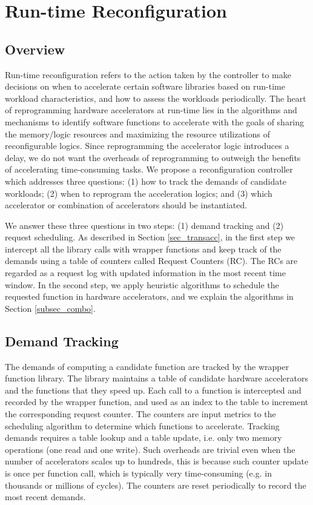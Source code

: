 \section{Run-time Reconfiguration }
\label{sec_runtime_reconfig}

\subsection{Overview}
\label{subsec_runtime_reconfig_overview}

Run-time reconfiguration refers to the action taken by the controller
to make decisions on when to accelerate certain software libraries
based on run-time workload characteristics, and how to assess the
workloads periodically. The heart of reprogramming hardware
accelerators at run-time lies in the algorithms and mechanisms to
identify software functions to accelerate with the goals of sharing
the memory/logic resources and maximizing the resource utilizations of
reconfigurable logics. Since reprogramming the accelerator logic 
introduces a delay, we do not want the overheads of
reprogramming to outweigh the benefits of accelerating time-consuming
tasks. We propose a reconfiguration controller which addresses three
questions: (1) how to track the demands of candidate workloads; (2)
when to reprogram the acceleration logics; and (3) which accelerator
or combination of accelerators should be instantiated.


We answer these three questions in two steps:
(1) demand tracking and (2) request scheduling. As described in
Section \ref{sec_transacc}, in the first step we intercept all the
library calls with wrapper functions and keep track of the demands
using a table of counters called Request Counters (RC). The RCs
are regarded as a request log with updated information in the most
recent time window. In the second step, we apply heuristic algorithms to
schedule the requested function in hardware accelerators, and we
explain the algorithms in Section \ref{subsec_combo}. 

\subsection{Demand Tracking} 

The demands of computing a candidate function are tracked by the
wrapper function library. The library maintains a table of candidate
hardware accelerators and the functions that they speed up. Each call
to a function is intercepted and recorded by the wrapper function, and used as an
index to the table to increment the corresponding request counter. The
counters are input metrics to the scheduling algorithm to determine which
functions to accelerate. Tracking demands requires a table
lookup and a table update, i.e. only two memory operations (one
read and one write). Such overheads are trivial even when the number
of accelerators scales up to hundreds, this is because such counter
update is once per function call, which is typically very
time-consuming (e.g. in thousands or millions of cycles). The counters
are reset periodically to record the most recent demands. 


